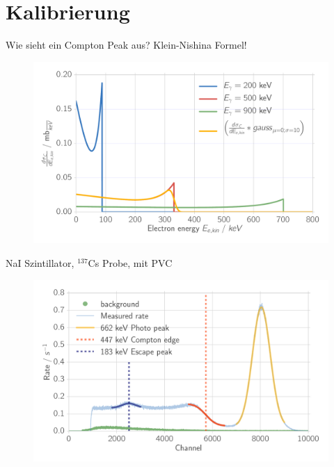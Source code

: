 \documentclass[xcolor=x11names,compress]{beamer}
\renewcommand{\(}{\begin{columns}}
\renewcommand{\)}{\end{columns}}
\newcommand{\<}[1]{\begin{column}{#1}}
\renewcommand{\>}{\end{column}}
\begin{document}
\section{Kalibrierung}
\begin{frame}[t]{Wie sieht ein Compton Peak aus? Klein-Nishina Formel!}
\begin{figure}[htpb]
    \centering
    \includegraphics[width=1.0\linewidth]{../analysis/figures/theory_dsde}
\label{fig:theory_kn}
\end{figure}
\end{frame}

\begin{frame}[t]{NaI Szintillator, $^{137}$Cs Probe, mit PVC}
 \begin{figure}[htpb]
    \centering
    \includegraphics[width=1.0\linewidth]{../analysis/figures/histo_na_137cs}
    \label{fig:histo_na_137cs}
\end{figure}
\end{frame}
\end{document}
